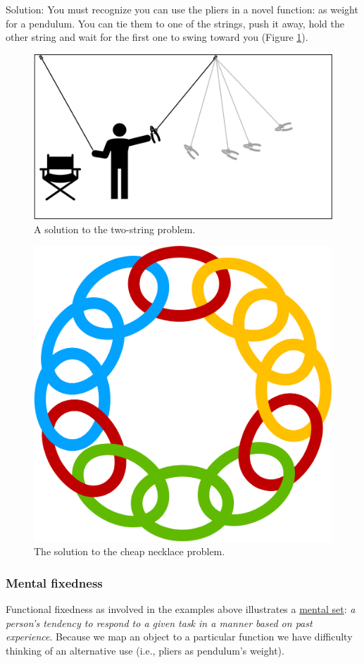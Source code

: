 \documentclass[
]{krantz}
\begin{document}
Solution: You must recognize you can use the pliers in a novel function: as weight for a pendulum. You can tie them to one of the strings, push it away, hold the other string and wait for the first one to swing toward you (Figure \ref{fig:twostring2}).

\begin{figure}

{\centering \includegraphics[width=0.6\linewidth]{images/ch10/twostring2} 

}

\caption{A solution to the two-string problem.}\label{fig:twostring2}
\end{figure}

\begin{figure}

{\centering \includegraphics[width=0.5\linewidth]{images/ch10/chain2} 

}

\caption{The solution to the cheap necklace problem.}\label{fig:chain2}
\end{figure}

\hypertarget{mental-fixedness}{%
\subsubsection*{Mental fixedness}\label{mental-fixedness}}


Functional fixedness as involved in the examples above illustrates a \protect\hyperlink{mental-set}{mental set}: \emph{a person's tendency to respond to a given task in a manner based on past experience}. Because we map an object to a particular function we have difficulty thinking of an alternative use (i.e., pliers as pendulum's weight).
\end{document}
